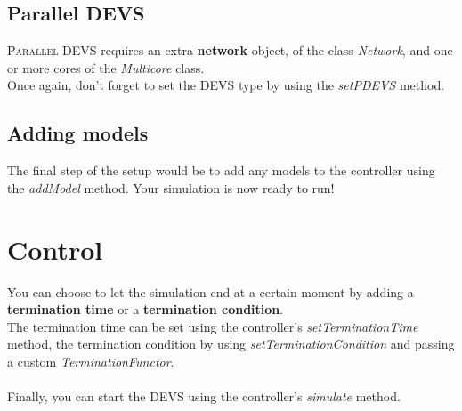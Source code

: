\subsection{Parallel DEVS}
\textsc{Parallel DEVS} requires an extra \textbf{network} object, of the class \textsl{Network}, and one or more cores of the \textsl{Multicore} class.\\
Once again, don't forget to set the DEVS type by using the \textsl{setPDEVS} method.

\subsection{Adding models}
The final step of the setup would be to add any models to the controller using the \textsl{addModel} method. Your simulation is now ready to run!

\section{Control}
You can choose to let the simulation end at a certain moment by adding a \textbf{termination time} or a \textbf{termination condition}.\\
The termination time can be set using the controller's \textsl{setTerminationTime} method, the termination condition by using \textsl{setTerminationCondition} and passing a custom \textsl{TerminationFunctor}.\\ %
\\
Finally, you can start the DEVS using the controller's \textsl{simulate} method.
